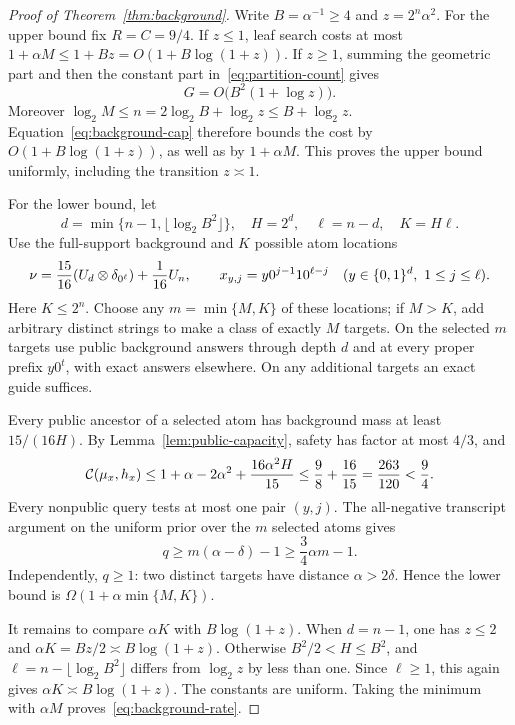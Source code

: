 \begin{proof}[Proof of Theorem~\ref{thm:background}]
Write $B=\alpha^{-1}\ge4$ and $z=2^n\alpha^2$. For the upper bound fix $R=C=9/4$. If $z\le1$, leaf search costs at most $1+\alpha M\le1+Bz=O(1+B\log(1+z))$. If $z\ge1$, summing the geometric part and then the constant part in~\eqref{eq:partition-count} gives
\[
 G=O\bigl(B^2(1+\log z)\bigr).
\]
Moreover $\log_2 M\le n=2\log_2 B+\log_2 z\le B+\log_2 z$. Equation~\eqref{eq:background-cap} therefore bounds the cost by $O(1+B\log(1+z))$, as well as by $1+\alpha M$. This proves the upper bound uniformly, including the transition $z\asymp1$.

For the lower bound, let
\[
 d=\min\{n-1,\lfloor\log_2 B^2\rfloor\},\quad
 H=2^d,\quad \ell=n-d,\quad K=H\ell.
\]
Use the full-support background and $K$ possible atom locations
\[
 \nu=\frac{15}{16}(U_d\otimes\delta_{0^\ell})+\frac1{16}U_n,
 \qquad x_{y,j}=y0^{j-1}10^{\ell-j}
 \quad(y\in\{0,1\}^d,\ 1\le j\le\ell).
\]
Here $K\le2^n$. Choose any $m=\min\{M,K\}$ of these locations; if $M>K$, add arbitrary distinct strings to make a class of exactly $M$ targets. On the selected $m$ targets use public background answers through depth $d$ and at every proper prefix $y0^t$, with exact answers elsewhere. On any additional targets an exact guide suffices.

Every public ancestor of a selected atom has background mass at least $15/(16H)$. By Lemma~\ref{lem:public-capacity}, safety has factor at most $4/3$, and
\[
 \mathcal C(\mu_x,h_x)\le 1+\alpha-2\alpha^2+\frac{16\alpha^2H}{15}
 \le\frac98+\frac{16}{15}=\frac{263}{120}<\frac94.
\]
Every nonpublic query tests at most one pair $(y,j)$. The all-negative transcript argument on the uniform prior over the $m$ selected atoms gives
\[
 q\ge m(\alpha-\delta)-1\ge\frac34\alpha m-1.
\]
Independently, $q\ge1$: two distinct targets have distance $\alpha>2\delta$. Hence the lower bound is $\Omega(1+\alpha\min\{M,K\})$.

It remains to compare $\alpha K$ with $B\log(1+z)$. When $d=n-1$, one has $z\le2$ and $\alpha K=Bz/2\asymp B\log(1+z)$. Otherwise $B^2/2<H\le B^2$, and $\ell=n-\lfloor\log_2 B^2\rfloor$ differs from $\log_2 z$ by less than one. Since $\ell\ge1$, this again gives $\alpha K\asymp B\log(1+z)$. The constants are uniform. Taking the minimum with $\alpha M$ proves~\eqref{eq:background-rate}.
\end{proof}

